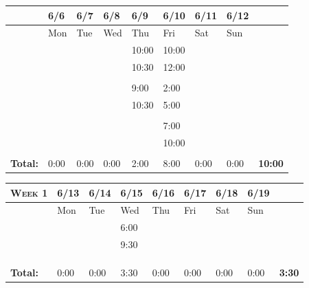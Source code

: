 \documentclass{article}
\begin{document}
\vspace{0.2in}

\begin{tabular}{ |m{1cm}||m{1cm}|m{1cm}|m{1cm}|m{1cm}|m{1cm}|m{1cm}|m{1cm}||m{1cm}|} 
\hline
 & 6/6 & 6/7 & 6/8 & 6/9 & 6/10 & 6/11 & 6/12 & \\ 
\hline
\rowcolor{lightgray} 
\cellcolor{white} & Mon & Tue & Wed & Thu & Fri & Sat & Sun & \cellcolor{white}\\ 
\hline
\hline
 & & & & 10:00 & 10:00 & & & \\ 
\hline
 & & & & 10:30 & 12:00 & & & \\ 
\hline
 & & & & & & & & \\ 
\hline
 & & & & 9:00 & 2:00 & & & \\ 
\hline
 & & & & 10:30 & 5:00 & & & \\ 
\hline
& & & & & & & & \\
\hline
& & & & & 7:00 & & & \\
\hline
& & & & & 10:00 & & & \\
\hline
& & & & & & & & \\
\hline
\textbf{Total:} & 0:00 & 0:00 & 0:00 & 2:00 & 8:00 & 0:00 & 0:00 & \textbf{10:00} \\
\hline
\end{tabular}

\vspace{0.2in}

\begin{tabular}{ |m{1cm}||m{1cm}|m{1cm}|m{1cm}|m{1cm}|m{1cm}|m{1cm}|m{1cm}||m{1cm}|} 
\hline
\textsc{Week 1} & 6/13 & 6/14 & 6/15 & 6/16 & 6/17 & 6/18 & 6/19 & \\ 
\hline
\rowcolor{lightgray} 
\cellcolor{white} & Mon & Tue & Wed & Thu & Fri & Sat & Sun & \cellcolor{white}\\ 
\hline
\hline
 & & & 6:00 & & & & & \\ 
\hline
 & & & 9:30 & & & & & \\ 
\hline
 & & & & & & & & \\ 
\hline
 & & & & & & & & \\ 
\hline
 & & & & & & & & \\ 
\hline
\textbf{Total:} & 0:00 & 0:00 & 3:30 & 0:00 & 0:00 & 0:00 & 0:00 & \textbf{3:30} \\
\hline
\end{tabular}

\vspace{0.2in}
\end{document}
